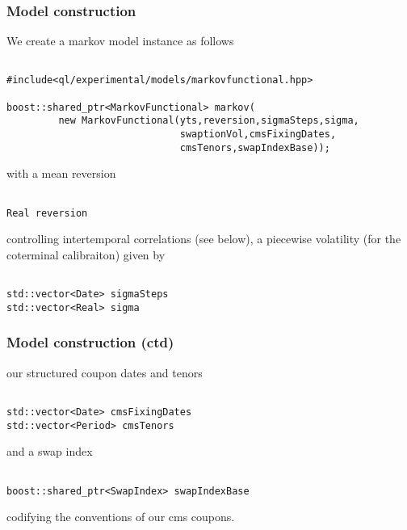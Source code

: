 \message{ !name(mfpresql.tex)}\documentclass{beamer}
\begin{document}
\begin{frame}[fragile]
\frametitle{Model construction}
We create a markov model instance as follows 
\begin{verbatim}

#include<ql/experimental/models/markovfunctional.hpp>

boost::shared_ptr<MarkovFunctional> markov(
         new MarkovFunctional(yts,reversion,sigmaSteps,sigma,
                              swaptionVol,cmsFixingDates,
                              cmsTenors,swapIndexBase));

\end{verbatim}
with a mean reversion
\begin{verbatim}

Real reversion

\end{verbatim}
 controlling intertemporal correlations (see below), a piecewise volatility (for the coterminal
calibraiton) given by
\begin{verbatim}

std::vector<Date> sigmaSteps
std::vector<Real> sigma

\end{verbatim}
\end{frame}

\begin{frame}[fragile]
\frametitle{Model construction (ctd)}
our structured coupon dates and tenors
\begin{verbatim}

std::vector<Date> cmsFixingDates
std::vector<Period> cmsTenors

\end{verbatim}
and a swap index 
\begin{verbatim}

boost::shared_ptr<SwapIndex> swapIndexBase

\end{verbatim}
codifying the conventions of our cms coupons.
\end{frame}
\end{document}
